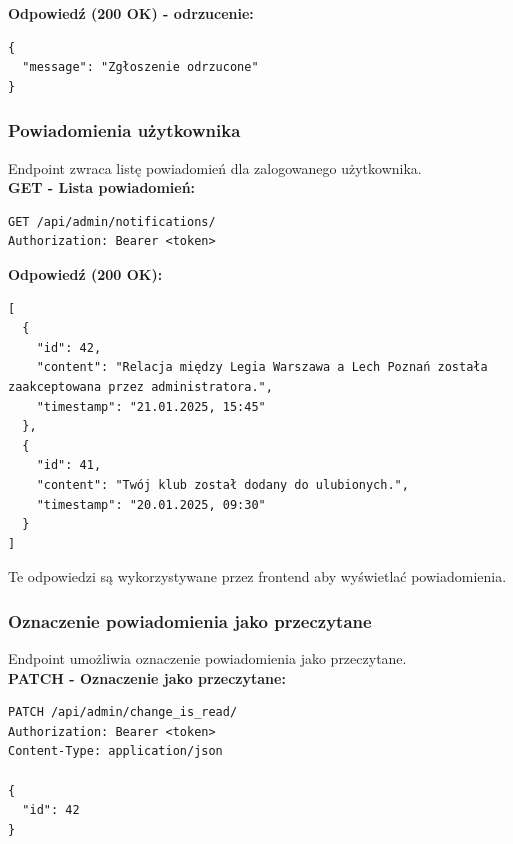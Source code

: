 \documentclass[a4paper,12pt]{article}
\begin{document}
\vspace{0.5cm}

\textbf{Odpowiedź (200 OK) - odrzucenie:}
\begin{lstlisting}
{
  "message": "Zgłoszenie odrzucone"
}
\end{lstlisting}

\newpage

\subsubsection{Powiadomienia użytkownika}

Endpoint zwraca listę powiadomień dla zalogowanego użytkownika. \\

\textbf{GET - Lista powiadomień:}
\begin{lstlisting}
GET /api/admin/notifications/
Authorization: Bearer <token>
\end{lstlisting}

\vspace{0.5cm}

\textbf{Odpowiedź (200 OK):}
\begin{lstlisting}
[
  {
    "id": 42,
    "content": "Relacja między Legia Warszawa a Lech Poznań została zaakceptowana przez administratora.",
    "timestamp": "21.01.2025, 15:45"
  },
  {
    "id": 41,
    "content": "Twój klub został dodany do ulubionych.",
    "timestamp": "20.01.2025, 09:30"
  }
]
\end{lstlisting}

\vspace{0.5cm}

Te odpowiedzi są wykorzystywane przez frontend aby wyświetlać powiadomienia.

\newpage

\subsubsection{Oznaczenie powiadomienia jako przeczytane}

Endpoint umożliwia oznaczenie powiadomienia jako przeczytane. \\

\textbf{PATCH - Oznaczenie jako przeczytane:}
\begin{lstlisting}
PATCH /api/admin/change_is_read/
Authorization: Bearer <token>
Content-Type: application/json

{
  "id": 42
}
\end{lstlisting}
\end{document}
